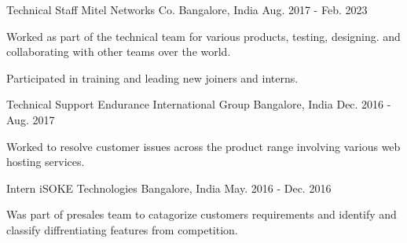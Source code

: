 

\begin{cventries}

  \cventry
    {Technical Staff} %
    {Mitel Networks Co.} %
    {Bangalore, India} %
    {Aug. 2017 - Feb. 2023} %
    {
      \begin{cvitems} %
        \item {Worked as part of the technical team for various products, testing, designing. and collaborating with other teams over the world.}
        \item {Participated in training and leading new joiners and interns.}
      \end{cvitems}
    }

  \cventry
    {Technical Support} %
    {Endurance International Group} %
    {Bangalore, India} %
    {Dec. 2016 - Aug. 2017} %
    {
      \begin{cvitems} %
        \item {Worked to resolve customer issues across the product range involving various web hosting services.}
      \end{cvitems}
    }

  \cventry
    {Intern} %
    {iSOKE Technologies } %
    {Bangalore, India} %
    {May. 2016 - Dec. 2016} %
    {
      \begin{cvitems} %
        \item { Was part of presales team to catagorize customers requirements and identify and classify diffrentiating features from competition.}
      \end{cvitems}
    }
\end{cventries}
